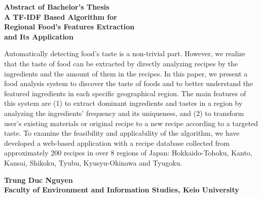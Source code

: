 \begin{center}

\begin{Large}
{\bf Abstract of Bachelor's Thesis} \\

\vspace{5mm}
{\bf A TF-IDF Based Algorithm for \\Regional Food's Features Extraction\\ and Its Application}

\end{Large}
\end{center}

\vspace{0.4cm}
Automatically detecting food's taste is a non-trivial part. However, we realize that the taste of food can be extracted by directly analyzing recipes by the ingredients and the amount of them in the recipes. 
In this paper, we present a food analysis system to discover the taste of foods and to better understand the featured ingredients in each specific geographical region. The main features of this system are (1) to extract dominant ingredients and tastes in a region by analyzing the ingredients' frequency and its uniqueness, and (2) to transform user's existing materials or original recipe to a new recipe according to a targeted taste. To examine the feasibility and applicability of the algorithm, we have developed a web-based application with a recipe database collected from approximately 200 recipes in over 8 regions of Japan: Hokkaido-Tohoku, Kanto, Kansai, Shikoku, Tyubu, Kyusyu-Okinawa and Tyugoku. 
\vspace{-2.5mm}

\begin{flushright}
{\bf Trung Duc Nguyen}\\
\vspace{-2mm}
{\bf Faculty of Environment and Information Studies, Keio University}\\
\end{flushright}




